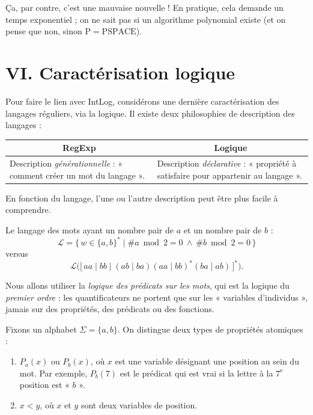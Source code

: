 \begin{remarque}
Ça, par contre, c'est une mauvaise nouvelle ! En pratique, cela demande un temps exponentiel ; on ne sait pas si un algorithme polynomial existe (et on pense que non, sinon $\mathrm{P} = \mathrm{PSPACE}$).
\end{remarque}

\section*{VI. Caractérisation logique}

Pour faire le lien avec IntLog, considérons une dernière caractérisation des langages réguliers, via la logique. Il existe deux philosophies de description des langages :

\begin{center}
\begin{tabular}{p{}|p{}}
\multicolumn{1}{c|}{\textbf{RegExp}} & \multicolumn{1}{c}{\textbf{Logique}} \\
\hline
Description \emph{générationnelle} : « comment créer un mot du langage ». &
Description \emph{déclarative} : « propriété à satisfaire pour appartenir au langage ». \\
\end{tabular}
\end{center}

En fonction du langage, l'une ou l'autre description peut être plus facile à comprendre.

\begin{exemple}
Le langage des mots ayant un nombre pair de $a$ et un nombre pair de $b$ :
\[
\mathcal{L} = \{\, w \in \{a,b\}^* \mid \#a \bmod 2 = 0 \ \wedge\ \#b \bmod 2 = 0 \,\}
\]
versus
\[
\mathcal{L}\Big( \big[\, aa \mid bb \mid (ab \mid ba)(aa \mid bb)^*(ba \mid ab) \,\big]^* \Big).
\]
\end{exemple}

Nous allons utiliser la \emph{logique des prédicats sur les mots}, qui est la logique du \emph{premier ordre} : les quantificateurs ne portent que sur les « variables d'individus », jamais sur des propriétés, des prédicats ou des fonctions.

Fixons un alphabet $\Sigma = \{a, b\}$. On distingue deux types de propriétés atomiques :
\begin{enumerate}
  \item $P_a(x)$ ou $P_b(x)$, où $x$ est une variable désignant une position au sein du mot.
  Par exemple, $P_b(7)$ est le prédicat qui est vrai si la lettre à la $7^{\text{e}}$ position est « $b$ ».
  \item $x < y$, où $x$ et $y$ sont deux variables de position.
\end{enumerate}

